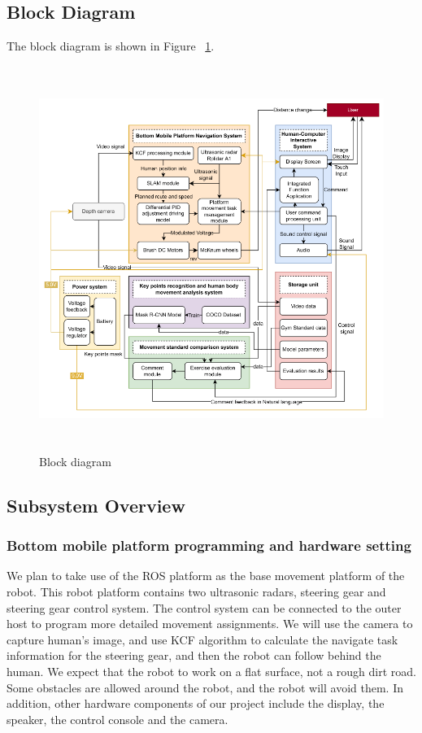 \subsection{Block Diagram}
The block diagram is shown in Figure ~\ref{bd}.
\begin{figure}[H]
    \centering
    \includegraphics[width=13.5cm,height=12.5cm]{sections/Block.png}
    \caption{Block diagram}
    \label{bd}
\end{figure}


\subsection{Subsystem Overview}
\subsubsection{Bottom mobile platform programming and hardware setting}
We plan to take use of the ROS platform as the base movement platform of the robot. This robot platform contains two ultrasonic radars, steering gear and steering gear control system. The control system can be connected to the outer host to program more detailed movement assignments. We will use the camera to capture human's image, and use KCF algorithm to calculate the navigate task information for the steering gear, and then the robot can follow behind the human. We expect that the robot to work on a flat surface, not a rough dirt road. Some obstacles are allowed around the robot, and the robot will
avoid them. In addition, other hardware components of our project include the display, the speaker, the control console and the camera. 
